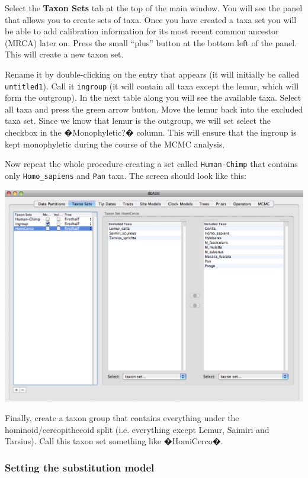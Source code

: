 \documentclass[12pt]{article}
\begin{document}
Select the {\bf Taxon Sets} tab at the top of the main window. You will see the
panel that allows you to create sets of taxa. Once you have created a taxa set you will be able to add calibration information for its most recent common
ancestor (MRCA) later on. Press the small ``plus''
button at the bottom left of the panel. This will create a new taxon
set. 

Rename it by double-clicking on the entry that appears (it will
initially be called \texttt{untitled1}). Call it \texttt{ingroup} (it will contain all taxa except the lemur, which will form the outgroup).
In the next table along you will see the available taxa. Select all taxa and press the green arrow button. Move the lemur back into the excluded taxa set. Since we know that lemur is the outgroup, we will set select the checkbox in the �Monophyletic?� column. This will ensure that the ingroup is kept monophyletic during the course of the MCMC analysis.

Now repeat the whole procedure creating a set called \texttt{Human-Chimp}
that contains only \texttt{Homo\_sapiens} and \texttt{Pan}
taxa. The screen should look like this:

\medskip{}

\includegraphics[scale=0.4]{figures/BEAUti_TaxonSets}

\medskip{}


Finally, create a taxon group that contains everything under the hominoid/cercopithecoid split (i.e. everything except Lemur, Saimiri and Tarsius). Call this taxon set something like �HomiCerco�.

\subsubsection*{Setting the substitution model}
\end{document}
